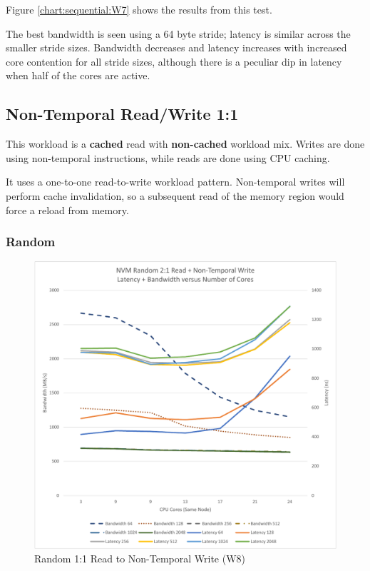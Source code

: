 Figure \ref{chart:sequential:W7} shows the results from this test.

The best bandwidth is seen using a 64 byte stride; latency is
similar across the smaller stride sizes.  Bandwidth decreases
and latency increases with increased core contention for all
stride sizes, although there is a peculiar dip in latency when
half of the cores are active.

\subsection{Non-Temporal Read/Write 1:1}

This workload is a \textbf{cached} read with 
\textbf{non-cached} workload mix.  Writes are done using
non-temporal instructions, while reads are done using CPU
caching.

It uses a one-to-one read-to-write workload pattern. Non-temporal
writes will perform cache invalidation, so a subsequent read of
the memory region would force a reload from memory.

\subsubsection{Random}

\begin{figure}
    \centering
    \caption{Random 1:1 Read to Non-Temporal Write (W8)}\label{chart:random:W8}
    \includegraphics[scale=0.5]{charts/random-w8-crop.pdf}
\end{figure}

